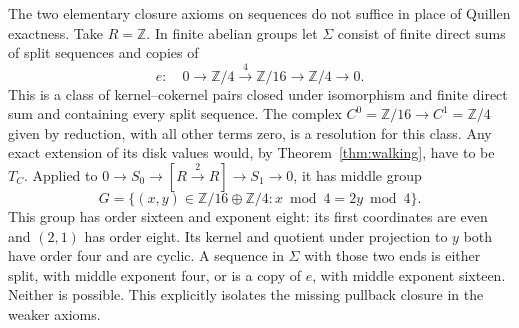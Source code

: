 \documentclass[11pt,a4paper]{article}
\theoremstyle{definition}
\newcommand{\Z}{\mathbb Z}
\begin{document}
The two elementary closure axioms on sequences do not suffice in
place of Quillen exactness. Take $R=\Z$. In finite abelian groups let $\Sigma$
consist of finite direct sums of split sequences and copies of
\[
 e:\quad0\longrightarrow\Z/4\xrightarrow{4}\Z/16
 \longrightarrow\Z/4\longrightarrow0.
\]
This is a class of kernel--cokernel pairs closed under isomorphism
and finite direct sum and containing every split sequence. The
complex $C^0=\Z/16\to C^1=\Z/4$ given by reduction, with all
other terms zero, is a resolution for this class. Any exact extension
of its disk values would, by Theorem~\ref{thm:walking}, have to be
$T_C$. Applied to $0\to S_0\to[R\xrightarrow{2}R]\to S_1\to0$,
it has middle group
\[
 G=\{(x,y)\in\Z/16\oplus\Z/4:x\bmod4=2y\bmod4\}.
\]
This group has order sixteen and exponent eight: its first
coordinates are even and $(2,1)$ has order eight. Its kernel and
quotient under projection to $y$ both have order four and are
cyclic. A sequence in $\Sigma$ with those two ends is either
split, with middle exponent four, or is a copy of $e$, with middle
exponent sixteen. Neither is possible. This explicitly isolates
the missing pullback closure in the weaker axioms.
\end{document}
